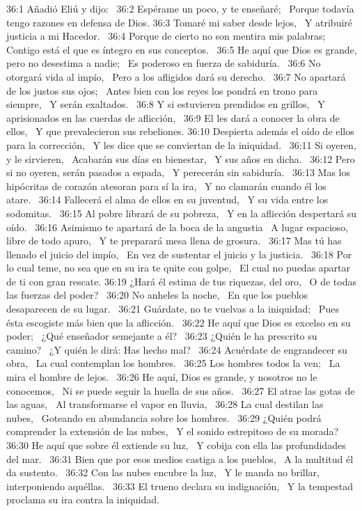 36:1 Añadió Eliú y dijo:  
36:2 Espérame un poco, y te enseñaré;  
Porque todavía tengo razones en defensa de Dios. 
36:3 Tomaré mi saber desde lejos,  
Y atribuiré justicia a mi Hacedor.  
36:4 Porque de cierto no son mentira mis palabras;  
Contigo está el que es íntegro en sus conceptos.  
36:5 He aquí que Dios es grande, pero no desestima a nadie;  
Es poderoso en fuerza de sabiduría.  
36:6 No otorgará vida al impío,  
Pero a los afligidos dará su derecho.  
36:7 No apartará de los justos sus ojos;  
Antes bien con los reyes los pondrá en trono para siempre,  
Y serán exaltados.  
36:8 Y si estuvieren prendidos en grillos,  
Y aprisionados en las cuerdas de aflicción,  
36:9 El les dará a conocer la obra de ellos,  
Y que prevalecieron sus rebeliones. 
36:10 Despierta además el oído de ellos para la corrección,  
Y les dice que se conviertan de la iniquidad.  
36:11 Si oyeren, y le sirvieren,  
Acabarán sus días en bienestar,  
Y sus años en dicha.  
36:12 Pero si no oyeren, serán pasados a espada,  
Y perecerán sin sabiduría.  
36:13 Mas los hipócritas de corazón atesoran para sí la ira,  
Y no clamarán cuando él los atare.  
36:14 Fallecerá el alma de ellos en su juventud,  
Y su vida entre los sodomitas.  
36:15 Al pobre librará de su pobreza,  
Y en la aflicción despertará su oído.  
36:16 Asimismo te apartará de la boca de la angustia  
A lugar espacioso, libre de todo apuro,  
Y te preparará mesa llena de grosura.  
36:17 Mas tú has llenado el juicio del impío,  
En vez de sustentar el juicio y la justicia.  
36:18 Por lo cual teme, no sea que en su ira te quite con golpe,  
El cual no puedas apartar de ti con gran rescate. 
36:19 ¿Hará él estima de tus riquezas, del oro,  
O de todas las fuerzas del poder?  
36:20 No anheles la noche,  
En que los pueblos desaparecen de su lugar.  
36:21 Guárdate, no te vuelvas a la iniquidad;  
Pues ésta escogiste más bien que la aflicción.  
36:22 He aquí que Dios es excelso en su poder;  
¿Qué enseñador semejante a él?  
36:23 ¿Quién le ha prescrito su camino?  
¿Y quién le dirá: Has hecho mal?  
36:24 Acuérdate de engrandecer su obra,  
La cual contemplan los hombres.  
36:25 Los hombres todos la ven;  
La mira el hombre de lejos.  
36:26 He aquí, Dios es grande, y nosotros no le conocemos,  
Ni se puede seguir la huella de sus años.  
36:27 El atrae las gotas de las aguas,  
Al transformarse el vapor en lluvia,  
36:28 La cual destilan las nubes,  
Goteando en abundancia sobre los hombres.  
36:29 ¿Quién podrá comprender la extensión de las nubes,  
Y el sonido estrepitoso de su morada?  
36:30 He aquí que sobre él extiende su luz,  
Y cobija con ella las profundidades del mar.  
36:31 Bien que por esos medios castiga a los pueblos,  
A la multitud él da sustento.  
36:32 Con las nubes encubre la luz,  
Y le manda no brillar, interponiendo aquéllas.  
36:33 El trueno declara su indignación,  
Y la tempestad proclama su ira contra la iniquidad.  
